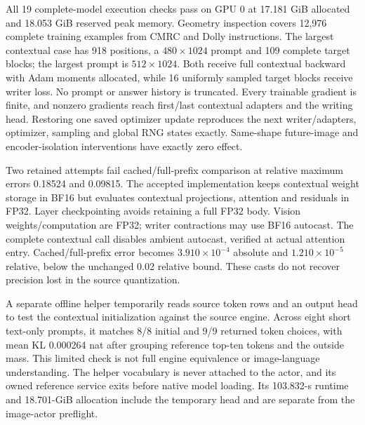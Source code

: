 \documentclass[10pt,a4paper]{article}
\begin{document}
All 19 complete-model execution checks pass on GPU 0 at 17.181 GiB allocated
and 18.053 GiB reserved peak memory. Geometry inspection covers 12,976 complete
training examples from CMRC and Dolly instructions\cite{cmrc,dolly}. The
largest contextual case has 918 positions, a $480\times1024$ prompt and
109 complete target blocks; the largest prompt is $512\times1024$.
Both receive full contextual backward with Adam moments allocated, while
16 uniformly sampled target blocks receive writer loss. No prompt or
answer history is truncated. Every trainable gradient is finite, and
nonzero gradients reach first/last contextual adapters and the writing head.
Restoring one saved optimizer update reproduces the next writer/adapters,
optimizer, sampling and global RNG states exactly. Same-shape future-image
and encoder-isolation interventions have exactly zero effect.

Two retained attempts fail cached/full-prefix comparison at relative maximum
errors 0.18524 and 0.09815. The accepted implementation keeps contextual weight
storage in BF16 but evaluates contextual projections, attention and residuals
in FP32. Layer checkpointing avoids retaining a full FP32 body. Vision
weights/computation are FP32; writer contractions may use BF16 autocast.
The complete contextual call disables ambient autocast, verified at actual
attention entry. Cached/full-prefix error becomes $3.910\times10^{-4}$
absolute and $1.210\times10^{-5}$ relative, below the unchanged 0.02 relative
bound. These casts do not recover precision lost in the source quantization.

A separate offline helper temporarily reads source token rows and an output
head to test the contextual initialization against the source engine. Across
eight short text-only prompts, it matches 8/8 initial and 9/9 returned token
choices, with mean KL 0.000264 nat after grouping reference top-ten tokens
and the outside mass. This limited check is not full engine equivalence or
image-language understanding. The helper vocabulary is never attached to
the actor, and its owned reference service exits before native model loading.
Its 103.832-s runtime and 18.701-GiB allocation include the temporary head
and are separate from the image-actor preflight.
\end{document}
